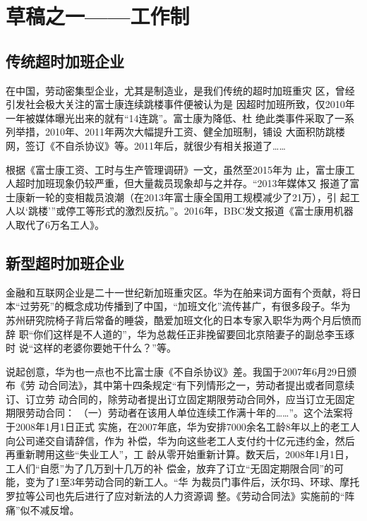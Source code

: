 \chapter{草稿之一——工作制}

\section{传统超时加班企业}

在中国，劳动密集型企业，尤其是制造业，是我们传统的超时加班重灾
区\cite{guojilaogongshijian}，曾经引发社会极大关注的富士康连续跳楼事件便被认为是
因超时加班所致，仅2010年一年被媒体曝光出来的就有“14连跳”。富士康为降低、杜
绝此类事件采取了一系列举措，2010年、2011年两次大幅提升工资、健全加班制，铺设
大面积防跳楼网，签订《不自杀协议》等。2011年后，就很少有相关报道了……

根据《富士康工资、工时与生产管理调研》\cite{fushikangzuixin}一文，虽然至2015年为
止，富士康工人超时加班现象仍较严重，但大量裁员现象却与之并存。“2013年媒体又
报道了富士康新一轮的变相裁员浪潮（在2013年富士康全国用工规模减少了21万），引
起工人以`跳楼'”或停工等形式的激烈反抗。”。2016年，BBC发文报道《富士康用机器
人取代了6万名工人》。

\section{新型超时加班企业}

金融和互联网企业是二十一世纪新加班重灾区。华为在舶来词方面有个贡献，将日
本“过劳死”的概念成功传播到了中国，“加班文化”流传甚广，有很多段子。华为
苏州研究院椅子背后常备的睡袋，酷爱加班文化的日本专家入职华为两个月后愤而辞
职“你们这样是不人道的”，华为总裁任正非挽留要回北京陪妻子的副总李玉琢时
说“这样的老婆你要她干什么？”等。

说起创意，华为也一点也不比富士康《不自杀协议》差。我国于2007年6月29日颁布《劳
动合同法》，其中第十四条规定“有下列情形之一，劳动者提出或者同意续订、订立劳
动合同的，除劳动者提出订立固定期限劳动合同外，应当订立无固定期限劳动合同：
（一）劳动者在该用人单位连续工作满十年的……”。这个法案将于2008年1月1日正式
实施，在2007年底，华为安排7000余名工龄8年以上的老工人向公司递交自请辞信，作为
补偿，华为向这些老工人支付约十亿元违约金，然后再重新聘用这些“失业工人”，工
龄从零开始重新计算。数天后，2008年1月1日，工人们“自愿”为了几万到十几万的补
偿金，放弃了订立“无固定期限合同”的可能，变为了1至3年劳动合同的新工人。“华
为裁员门事件后，沃尔玛、环球、摩托罗拉等公司也先后进行了应对新法的人力资源调
整。《劳动合同法》实施前的“阵痛”似不减反增。\cite{huaweimaiduan}

